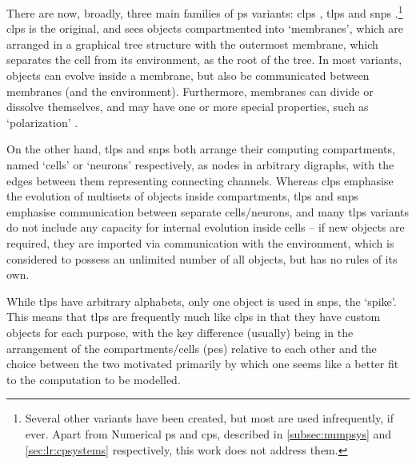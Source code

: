 There are now, broadly, three main families of \gls{ps} variants:  \gls{clps} \cite{Paun2001,Paun2002}, \gls{tlps} \cite{tMaPaPaRo01a,Martin-Vide2003} and \gls{snps} \cite{Ionescu2006}.\footnote{Several other variants have been created, but most are used infrequently, if ever.  Apart from Numerical \gls{ps} and \gls{cps}, described in \autoref{subsec:numpsys} and \autoref{sec:lr:cpsystems} respectively, this work does not address them.}  \Gls{clps} is the original, and sees objects compartmented into `membranes', which are arranged in a graphical tree structure with the outermost membrane, which separates the cell from its environment, as the root of the tree.  In most variants, objects can evolve inside a membrane, but also be communicated between membranes (and the environment).  Furthermore, membranes can divide or dissolve themselves, and may have one or more special properties, such as `polarization' \cite{Paun1999a}.

On the other hand, \gls{tlps} and \gls{snps} both arrange their computing compartments, named `cells' or `neurons' respectively, as nodes in arbitrary digraphs, with the edges between them representing connecting channels.  Whereas \gls{clps} emphasise the evolution of multisets of objects inside compartments, \gls{tlps} and \gls{snps} emphasise communication between separate cells/neurons, and many \gls{tlps} variants do not include any capacity for internal evolution inside cells -- if new objects are required, they are imported via communication with the environment, which is considered to possess an unlimited number of all objects, but has no rules of its own.

While \gls{tlps} have arbitrary alphabets, only one object is used in \gls{snps}, the `spike'.  This means that \gls{tlps} are frequently much like \gls{clps} in that they have custom objects for each purpose, with the key difference (usually) being in the arrangement of the compartments/cells (\glspl{pe}) relative to each other and the choice between the two motivated primarily by which one seems like a better fit to the computation to be modelled.

